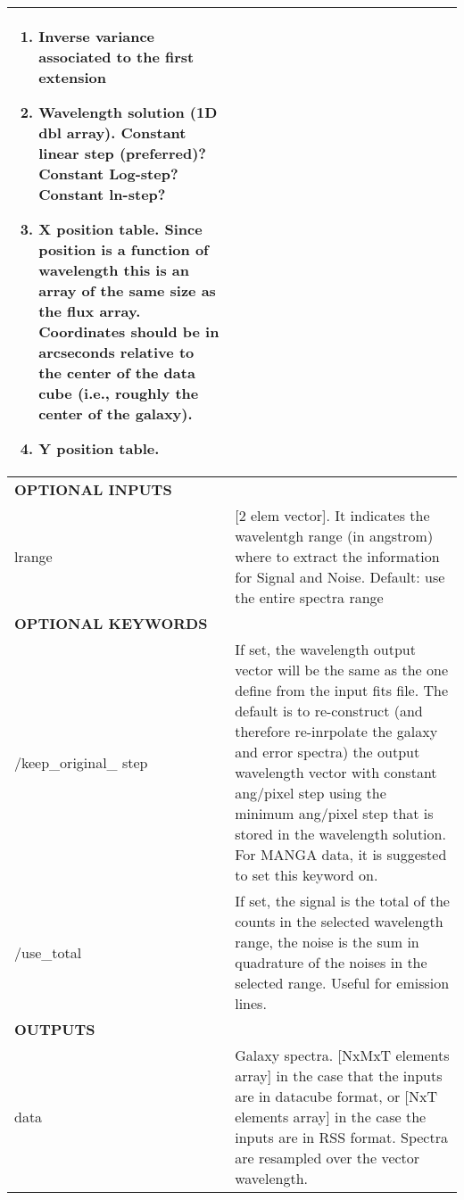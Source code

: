 \begin{center}
\begin{longtable}{p{2.7cm}| p{11.1cm}}
\begin{enumerate}
                            \item Inverse variance associated to the first extension

                            \item Wavelength solution (1D dbl array). Constant linear step
                              (preferred)? Constant Log-step? Constant ln-step?
                            
                            \item X position table.  Since position is a function of wavelength this is an 
                               array of the same size as the flux array.  Coordinates should be in arcseconds 
                               relative to the center of the data cube (i.e., roughly the center of the galaxy).
                            \item Y position table.
                            \end{enumerate}\\
%
\hline
{\bf  OPTIONAL INPUTS}  & \\
\hline
lrange & [2 elem vector]. It indicates the wavelentgh range (in angstrom) where to
       extract the information for Signal and Noise. Default: use the entire spectra range \\
%
\hline {\bf OPTIONAL KEYWORDS} &  \\ 
\hline 
/keep\_original\_ step & If set, the wavelength output vector will be the same as the one
                         define from the input fits file. The default
                         is to re-construct (and  therefore re-inrpolate the galaxy and error
                         spectra) the output wavelength vector with constant ang/pixel step
                         using the minimum ang/pixel step that is stored in the wavelength
                         solution. For MANGA data, it is suggested to set this keyword on.\\
%
 /use\_total           &   If set, the signal is the total of the counts in the selected wavelength range, the noise is the sum in
                         quadrature of the noises in the selected range. Useful for emission lines.\\
\hline
{\bf  OUTPUTS} &  \\
\hline
data           &  Galaxy spectra. [NxMxT elements array] in the case that the inputs are in datacube format, or [NxT elements array]
               in the case the inputs are in RSS format. Spectra are resampled over the vector wavelength.    \\

\end{longtable}
\end{center}
